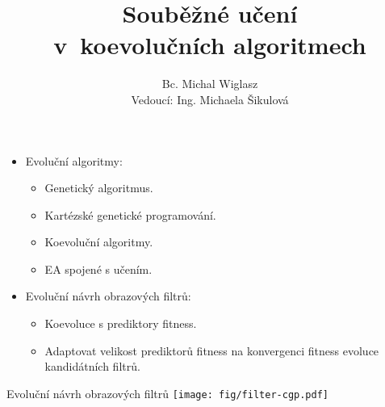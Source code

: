 \documentclass[14pt]{beamer}
\title[Souběžné učení v~koevolučních algoritmech]{\vskip0.5cm{}Souběžné učení\\v~koevolučních algoritmech}
\author[Bc. Michal Wiglasz]{Bc. Michal Wiglasz\\
  {\vskip1cm\footnotesize
  Vedoucí: Ing. Michaela Šikulová
}}
\date{}
\begin{document}
\begin{frame}
    \titlepage
\end{frame}







\begin{frame}{\insertshorttitle}
    \begin{itemize}
        \item Evoluční algoritmy:
        \begin{itemize}
            \item Genetický algoritmus.
            \item Kartézské genetické programování.
            \item Koevoluční algoritmy.
            \item EA spojené s učením.
        \end{itemize}
        \item Evoluční návrh obrazových filtrů:
        \begin{itemize}
            \item Koevoluce s prediktory fitness.
            \item Adaptovat velikost prediktorů fitness na konvergenci fitness evoluce kandidátních filtrů.
        \end{itemize}
    \end{itemize}
\end{frame}


\begin{frame}{Evoluční návrh obrazových filtrů}
    \center\texttt{[image: fig/filter-cgp.pdf]}
\end{frame}
\end{document}
